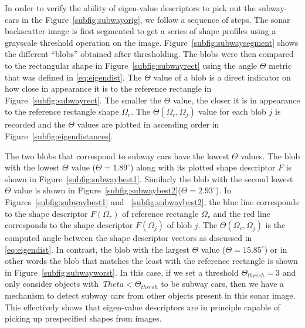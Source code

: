In order to verify the ability of eigen-value descriptors to pick out the subway-cars in the Figure~\ref{subfig:subwayorig}, we follow a sequence of steps. The sonar backscatter image is first segmented to get a series of shape profiles using a grayscale threshold operation on the image. Figure~\ref{subfig:subwaysegment} shows the different ``blobs'' obtained after thresholding. The blobs were then compared to the rectangular shape in Figure~\ref{subfig:subwayrect} using the angle $\Theta$ metric that was defined in \eqref{eq:eigendist}. The $\Theta$ value of a blob is a direct indicator on how close in appearance it is to the reference rectangle in Figure~\ref{subfig:subwayrect}. The smaller the $\Theta$ value, the closer it is in appearance to the reference rectangle shape $\Omega_r$. The $\Theta(\Omega_r,\Omega_j)$ value for each blob $j$ is recorded and the $\Theta$ values are plotted in ascending order in Figure~\ref{subfig:eigendistances}. 

The two blobs that correspond to subway cars have the lowest $\Theta$ values. The blob with the lowest $\Theta$ value ($\Theta=1.89^{\circ}$) along with its plotted shape descriptor $F$ is shown in Figure~\ref{subfig:subwaybest1}. Similarly the blob with the second lowest $\Theta$ value is shown in Figure~\ref{subfig:subwaybest2}($\Theta=2.93^{\circ}$). In Figures~\ref{subfig:subwaybest1} and ~\ref{subfig:subwaybest2}, the blue line corresponds to the shape descriptor $F(\Omega_r)$ of reference rectangle $\Omega_r$ and the red line corresponds to the shape descriptor $F(\Omega_j)$ of blob $j$. The $\Theta(\Omega_r,\Omega_j)$ is the computed angle between the shape descriptor vectors as discussed in \eqref{eq:eigendist}. In contrast, the blob with the largest $\Theta$ value ($\Theta=15.85^{\circ}$) or in other words the blob that matches the least with the reference rectangle is shown in Figure~\ref{subfig:subwayworst}. In this case, if we set a threshold $\Theta_{thresh}=3$ and only consider objects with $\
Theta<\Theta_{
thresh}$ to 
be subway cars, then we have a mechanism to detect subway cars from other objects present in this sonar image. This effectively shows that eigen-value descriptors are in principle capable of picking up prespecified shapes from images.

